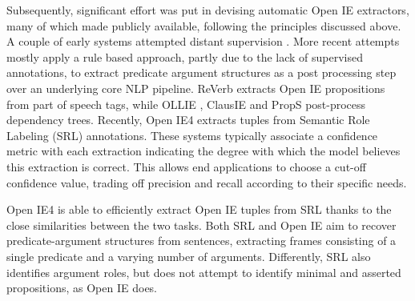 Subsequently, significant effort was put in devising automatic Open IE extractors, many of
which made publicly available, following the principles
discussed above.
A couple of  early systems attempted distant supervision \cite{wu2010open,banko2007open}.
More recent attempts mostly apply a rule based approach, partly due to the lack of supervised annotations,
to extract predicate argument structures
as a post processing step over an underlying core NLP pipeline.
ReVerb \cite{fader2011identifying} extracts Open IE propositions from part of speech tags, while
OLLIE \cite{mausam2012open}, ClausIE \cite{del2013clausie} and PropS \cite{props2016} post-process dependency trees.
Recently, Open IE4 extracts tuples from Semantic Role Labeling (SRL) annotations.
These systems typically associate a confidence metric with each extraction indicating
the degree with which the model believes this extraction is correct.
This allows end applications to choose a cut-off confidence value, trading off precision and recall according
to their specific needs.



Open IE4 is able to efficiently extract Open IE tuples from SRL thanks to
the close similarities between the two tasks.
Both SRL and Open IE aim to recover predicate-argument structures from sentences, extracting frames consisting
of a single predicate and a varying number of arguments.
Differently, SRL also identifies argument roles, but does not attempt
to identify minimal and asserted propositions, as Open IE does.


